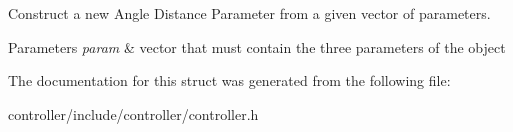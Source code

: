 Construct a new Angle Distance Parameter from a given vector of parameters. 


\begin{DoxyParams}{Parameters}
{\em param} & vector that must contain the three parameters of the object \\
\hline
\end{DoxyParams}


The documentation for this struct was generated from the following file\+:\begin{DoxyCompactItemize}
\item 
controller/include/controller/controller.\+h\end{DoxyCompactItemize}
